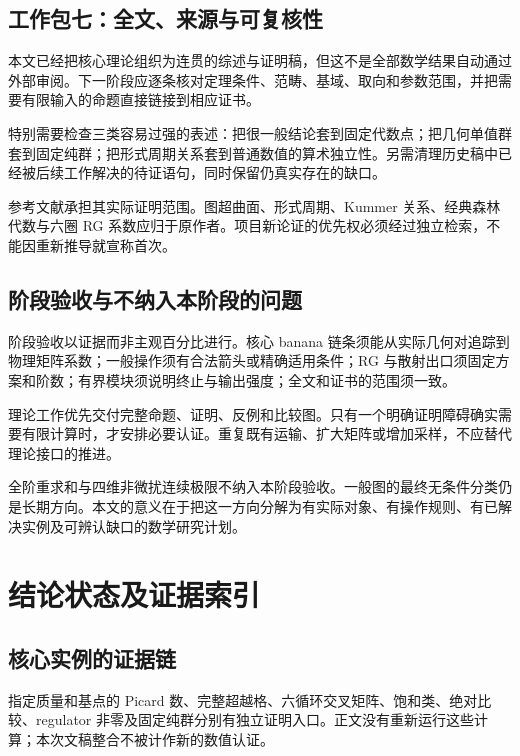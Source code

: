 \documentclass[11pt,a4paper,oneside]{ctexrep}
\theoremstyle{cnplain}
\theoremstyle{definition}
\theoremstyle{remark}
\begin{document}
\section{工作包七：全文、来源与可复核性}
本文已经把核心理论组织为连贯的综述与证明稿，但这不是全部数学结果自动通过外部审阅。下一阶段应逐条核对定理条件、范畴、基域、取向和参数范围，并把需要有限输入的命题直接链接到相应证书。

特别需要检查三类容易过强的表述：把很一般结论套到固定代数点；把几何单值群套到固定纯群；把形式周期关系套到普通数值的算术独立性。另需清理历史稿中已经被后续工作解决的待证语句，同时保留仍真实存在的缺口。

参考文献承担其实际证明范围。图超曲面、形式周期、Kummer 关系、经典森林代数与六圈 RG 系数应归于原作者。项目新论证的优先权必须经过独立检索，不能因重新推导就宣称首次。

\section{阶段验收与不纳入本阶段的问题}
阶段验收以证据而非主观百分比进行。核心 banana 链条须能从实际几何对追踪到物理矩阵系数；一般操作须有合法箭头或精确适用条件；RG 与散射出口须固定方案和阶数；有界模块须说明终止与输出强度；全文和证书的范围须一致。

理论工作优先交付完整命题、证明、反例和比较图。只有一个明确证明障碍确实需要有限计算时，才安排必要认证。重复既有运输、扩大矩阵或增加采样，不应替代理论接口的推进。

全阶重求和与四维非微扰连续极限不纳入本阶段验收。一般图的最终无条件分类仍是长期方向。本文的意义在于把这一方向分解为有实际对象、有操作规则、有已解决实例及可辨认缺口的数学研究计划。

\appendix
\chapter{结论状态及证据索引}\label{app:evidence}
\section{核心实例的证据链}
指定质量和基点的 Picard 数、完整超越格、六循环交叉矩阵、饱和类、绝对比较、regulator 非零及固定纯群分别有独立证明入口。正文没有重新运行这些计算；本次文稿整合不被计作新的数值认证。
\end{document}

